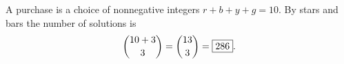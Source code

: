 A purchase is a choice of nonnegative integers $r+b+y+g=10$. By stars and bars the number of solutions is
\[
\dbinom{10+3}{3}=\dbinom{13}{3}=\boxed{286}.
\]
